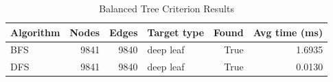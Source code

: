 \begin{table}[H]
\centering
\caption{Balanced Tree Criterion Results}
\begin{tabular}{lrrlrr}
\toprule
Algorithm & Nodes & Edges & Target type & Found & Avg time (ms)\\
\midrule
BFS & 9841 & 9840 & deep leaf & True & 1.6935\\
DFS & 9841 & 9840 & deep leaf & True & 0.0130\\
\bottomrule
\end{tabular}
\end{table}

